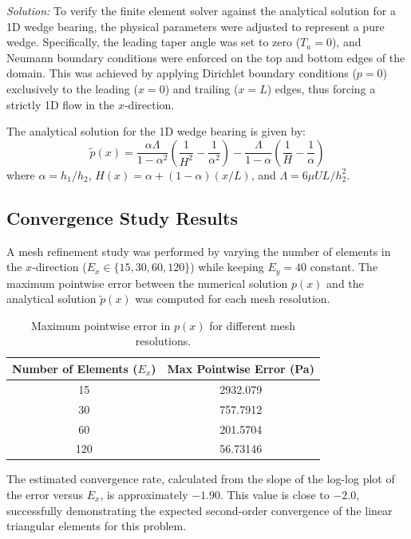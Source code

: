 \documentclass[11pt]{article}
\newenvironment{solution}
    {\textit{Solution:}}
    {}
\begin{document}
\begin{solution}
To verify the finite element solver against the analytical solution for a 1D wedge bearing, the physical parameters were adjusted to represent a pure wedge. Specifically, the leading taper angle was set to zero ($T_a = 0$), and Neumann boundary conditions were enforced on the top and bottom edges of the domain. This was achieved by applying Dirichlet boundary conditions ($p=0$) exclusively to the leading ($x=0$) and trailing ($x=L$) edges, thus forcing a strictly 1D flow in the $x$-direction.

The analytical solution for the 1D wedge bearing is given by:
\begin{equation}
    \tilde{p}(x) = \frac{\alpha\Lambda}{1-\alpha^2}\left(\frac{1}{H^2} - \frac{1}{\alpha^2}\right) - \frac{\Lambda}{1-\alpha}\left(\frac{1}{H} - \frac{1}{\alpha}\right)
\end{equation}
where $\alpha = h_1/h_2$, $H(x) = \alpha + (1-\alpha)(x/L)$, and $\Lambda = 6\mu UL/h_2^2$.

\subsection*{Convergence Study Results}
A mesh refinement study was performed by varying the number of elements in the $x$-direction ($E_x \in \{15, 30, 60, 120\}$) while keeping $E_y = 40$ constant. The maximum pointwise error between the numerical solution $p(x)$ and the analytical solution $\tilde{p}(x)$ was computed for each mesh resolution.

\begin{table}[H]
    \centering
    \begin{tabular}{|c|c|}
        \hline
        \textbf{Number of Elements ($E_x$)} & \textbf{Max Pointwise Error (Pa)} \\
        \hline
        15  & 2932.079 \\
        30  & 757.7912 \\
        60  & 201.5704 \\
        120 & 56.73146 \\
        \hline
    \end{tabular}
    \caption{Maximum pointwise error in $p(x)$ for different mesh resolutions.}
    \label{tab:convergence_data}
\end{table}

The estimated convergence rate, calculated from the slope of the log-log plot of the error versus $E_x$, is approximately \textbf{$-1.90$}. This value is close to $-2.0$, successfully demonstrating the expected second-order convergence of the linear triangular elements for this problem.


\end{solution}
\end{document}
